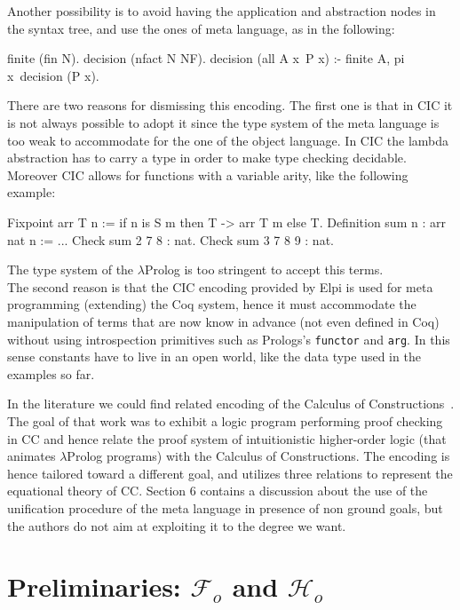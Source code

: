 \documentclass[sigconf,natbib=false,review]{acmart}
\newcommand{\Fo}{\ensuremath{\mathcal{F}_{\!o}\xspace}} %
\newcommand{\Ho}{\ensuremath{\mathcal{H}_o}\xspace}
\begin{document}
Another possibility is to avoid having the application and abstraction nodes
in the syntax tree, and use the ones of meta language, as in the following:

\begin{elpicode}
finite (fin N).
decision (nfact N NF).
decision (all A x\ P x) :- finite A, pi x\ decision (P x).
\end{elpicode}

\noindent
There are two reasons for dismissing this encoding. The first one is that
in CIC it is not always possible to adopt it since the type system
of the meta language is too weak to accommodate for the one of the 
object language. In CIC the lambda abstraction has to carry a type in order to
make type checking decidable. Moreover CIC allows for functions with a
variable arity, like the following example:

\begin{coqcode}
Fixpoint arr T n := if n is S m then T -> arr T m else T.
Definition sum n : arr nat n := ...
Check sum 2   7 8   : nat.
Check sum 3   7 8 9 : nat.
\end{coqcode}

\noindent
The type system of the $\lambda$Prolog is too stringent to accept this terms.\\
The second reason is that the CIC encoding provided by Elpi is used for meta
programming (extending) the Coq system, hence it must accommodate the
manipulation of terms that are now know in advance (not even defined in Coq)
without using introspection primitives such as Prologs's \texttt{functor}
and \texttt{arg}. In this sense constants have to live in an open world, like
the  data type used in the examples so far.

In the literature we could find related encoding of the Calculus of
Constructions~\cite{felty93lics}. The goal of that work was to exhibit
a logic program performing proof checking in CC and hence relate the
proof system of intuitionistic higher-order logic (that animates $\lambda$Prolog
programs) with the Calculus of Constructions. The encoding is hence tailored
toward a different goal, and utilizes three relations to represent the
equational theory of CC. Section 6 contains a discussion about the use of the
unification procedure of the meta language in presence of non ground goals, but
the authors do not aim at exploiting it to the degree we want.

\section{Preliminaries: \Fo{} and \Ho}
\label{sec:lang-spec}
\end{document}
